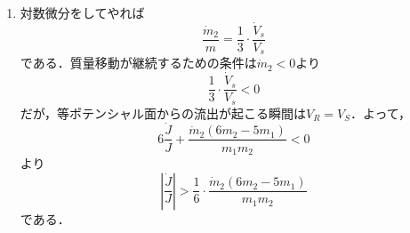 \documentclass[a4paper,pdflatex,ja=standard]{bxjsarticle}
\begin{document}
\begin{enumerate}
  \item 
  対数微分をしてやれば
  \begin{equation}
    \frac{\dot{m}_{2}}{m}
    =
    \frac{1}{3}\cdot\frac{\dot{V}_{s}}{V_{s}}
  \end{equation}
  である．質量移動が継続するための条件は$\dot{m}_{2}<0$より
  \begin{equation}
    \frac{1}{3}\cdot\frac{\dot{V}_{s}}{V_{s}}<0
  \end{equation}
  だが，等ポテンシャル面からの流出が起こる瞬間は$V_{R}=V_{S}$．よって，
  \begin{equation}
    6
    \frac{\dot{J}}{J}
    +
    \frac{\dot{m}_{2}(6m_{2}-5m_{1})}{m_{1}m_{2}}
    <
    0
  \end{equation}
  より
  \begin{equation}
    \left|
      \frac{\dot{J}}{J}
    \right|
    >
    \frac{1}{6}
    \cdot
    \frac{\dot{m}_{2}(6m_{2}-5m_{1})}{m_{1}m_{2}}
  \end{equation}
  である．
  
\end{enumerate}
\end{document}
